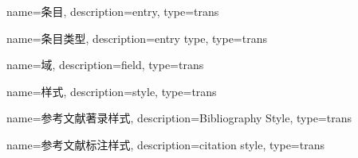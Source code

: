 {
name={条目},
description={entry},
type={trans}
}

{
name={条目类型},
description={entry type},
type={trans}
}

{
name={域},
description={field},
type={trans}
}

{
name={样式},
description={style},
type={trans}
}

{
name={参考文献著录样式},
description={Bibliography Style},
type={trans}
}

{
name={参考文献标注样式},
description={citation style},
type={trans}
}

